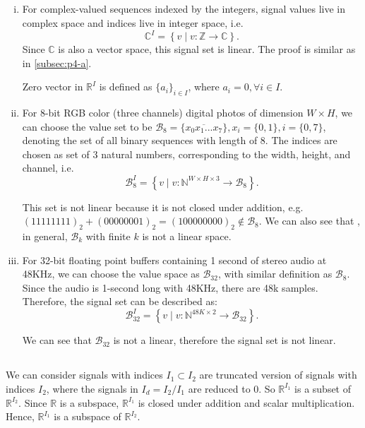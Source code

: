 \subsection{}\label{subsec:p4-b}
\begin{enumerate}[(i)]
	\item For complex-valued sequences indexed by the integers, signal values live in complex space and indices live in integer space, i.e.
	\[\mathbb{C}^I = \left\{ v \mid v: \mathbb{Z} \rightarrow \mathbb{C}\right\}. \]
	Since $\mathbb{C}$ is also a vector space, this signal set is linear. The proof is similar as in \ref{subsec:p4-a}.
	
	Zero vector in $\mathbb{R}^I$ is defined as $\{ a_i \}_{i \in I}$, where $a_i = 0, \forall i \in I$.
	
	\item For 8-bit RGB color (three channels) digital photos of dimension $W \times H$, we can choose the value set to be $\mathcal{B}_8 = \{\overline{x_0 x_1 ... x_7}\}, x_i = \{0,1\}, i = \{0,7\}$, denoting the set of all binary sequences with length of 8. The indices are chosen as set of 3 natural numbers, corresponding to the width, height, and channel, i.e.
	\[\mathcal{B}_8^I = \left\{ v \mid v : \mathbb{N}^{W \times H \times 3} \rightarrow \mathcal{B}_8\right\}.\]

	This set is not linear because it is not closed under addition, e.g. $(11111111)_2 + (00000001)_2 = (100000000)_2 \notin \mathcal{B}_8$. We can also see that , in general, $\mathcal{B}_k$ with finite $k$ is not a linear space.
	
	\item For 32-bit floating point buffers containing 1 second of stereo audio at 48KHz, we can choose the value space as $\mathcal{B}_{32}$, with similar definition as $\mathcal{B}_8$. Since the audio is 1-second long with 48KHz, there are 48k samples. Therefore, the signal set can be described as:
	\[\mathcal{B}_{32}^I = \left\{v \mid v : \mathbb{N}^{48K \times 2} \rightarrow \mathcal{B}_{32}\right\}.\]
	
	We can see that $\mathcal{B}_{32}$ is not a linear, therefore the signal set is not linear.
\end{enumerate}


\subsection{}\label{subsec:p4-c}
We can consider signals with indices $I_1 \subset I_2$ are truncated version of signals with indices $I_2$, where the signals in $I_d = I_2 / I_1$ are reduced to 0. So $\mathbb{R}^{I_1}$ is a subset of $\mathbb{R}^{I_2}$. Since $\mathbb{R}$ is a subspace, $\mathbb{R}^{I_1}$ is closed under addition and scalar multiplication. Hence, $\mathbb{R}^{I_1}$ is a subspace of $\mathbb{R}^{I_2}$.


